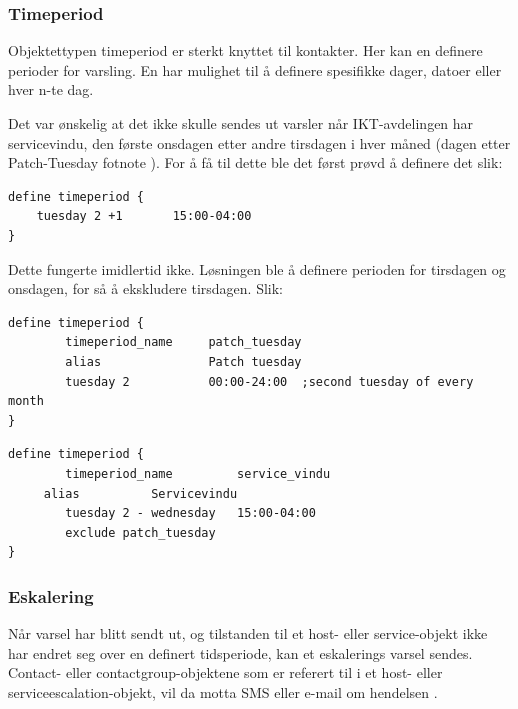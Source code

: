 \subsubsection{Timeperiod}

Objektettypen timeperiod er sterkt knyttet til kontakter. Her kan en definere perioder for varsling. En har mulighet til å definere spesifikke dager, datoer eller hver n-te dag. 

Det var ønskelig at det ikke skulle sendes ut varsler når IKT-avdelingen har servicevindu, den første onsdagen etter andre tirsdagen i hver måned (dagen etter Patch-Tuesday fotnote \cite{wiki:patch}). For å få til dette ble det først prøvd å definere det slik:

\begin{lstlisting}
define timeperiod {
	tuesday 2 +1       15:00-04:00
}
\end{lstlisting}

Dette fungerte imidlertid ikke. Løsningen ble å definere perioden for tirsdagen og onsdagen, for så å ekskludere tirsdagen. Slik:
\begin{lstlisting}
define timeperiod {
        timeperiod_name 	patch_tuesday
        alias           	Patch tuesday
        tuesday 2          	00:00-24:00  ;second tuesday of every month
}
\end{lstlisting}

\begin{lstlisting}
define timeperiod {
        timeperiod_name         service_vindu
	 alias			Servicevindu
        tuesday 2 - wednesday   15:00-04:00
        exclude patch_tuesday
}
\end{lstlisting}

\subsubsection{Eskalering}

Når varsel har blitt sendt ut, og tilstanden til et host- eller service-objekt ikke har endret seg over en definert tidsperiode, kan et eskalerings varsel sendes. Contact- eller contactgroup-objektene som er referert til i et host- eller serviceescalation-objekt, vil da motta SMS eller e-mail om hendelsen .

